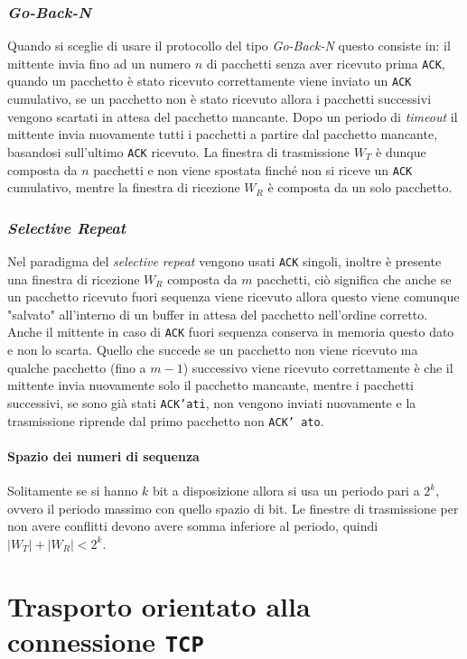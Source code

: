         \subsubsection{\textit{Go-Back-N}}
            Quando si sceglie di usare il protocollo del tipo \textit{Go-Back-N} questo consiste in: il mittente invia fino ad un numero $ n $ di pacchetti senza aver ricevuto prima \texttt{ACK}, quando un pacchetto è stato ricevuto correttamente viene inviato un \texttt{ACK} cumulativo, se un pacchetto non è stato ricevuto allora i pacchetti successivi vengono scartati in attesa del pacchetto mancante. Dopo un periodo di \textit{timeout} il mittente invia nuovamente tutti i pacchetti a partire dal pacchetto mancante, basandosi sull'ultimo \texttt{ACK} ricevuto. La finestra di trasmissione $ W_T $ è dunque composta da $ n $ pacchetti e non viene spostata finché non si riceve un \texttt{ACK} cumulativo, mentre la finestra di ricezione $ W_R $ è composta da un solo pacchetto.
        \subsubsection{\textit{Selective Repeat}}
            Nel paradigma del \textit{selective repeat} vengono usati \texttt{ACK} singoli, inoltre è presente una finestra di ricezione $ W_R $ composta da $ m $ pacchetti, ciò significa che anche se un pacchetto ricevuto fuori sequenza viene ricevuto allora questo viene comunque "salvato" all'interno di un buffer in attesa del pacchetto nell'ordine corretto. Anche il mittente in caso di \texttt{ACK} fuori sequenza conserva in memoria questo dato e non lo scarta. Quello che succede se un pacchetto non viene ricevuto ma qualche pacchetto (fino a $m-1$) successivo viene ricevuto correttamente è che il mittente invia nuovamente solo il pacchetto mancante, mentre i pacchetti successivi, se sono già stati \texttt{ACK'ati}, non vengono inviati nuovamente e la trasmissione riprende dal primo pacchetto non \texttt{ACK' ato}.
        \paragraph{Spazio dei numeri di sequenza}
            Solitamente se si hanno $ k $ bit a disposizione allora si usa un periodo pari a $ 2^k $, ovvero il periodo massimo con quello spazio di bit. Le finestre di trasmissione per non avere conflitti devono avere somma inferiore al periodo, quindi $ |W_T| + |W_R| < 2^k $.
\section[Trasporto Orientato Connessione \texttt{TCP}]{Trasporto orientato alla connessione \texttt{TCP}}
